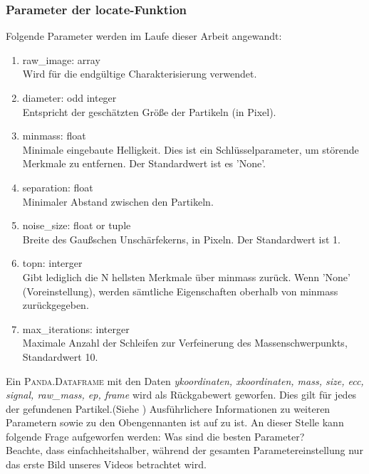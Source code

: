 	\subsubsection{Parameter der locate-Funktion}
		Folgende Parameter werden im Laufe dieser Arbeit angewandt:

		\begin{enumerate}
    			\item raw\_image: array \\
    			Wird für die endgültige Charakterisierung verwendet.
    			\item diameter: odd integer \\
    			Entspricht der geschätzten Größe der Partikeln (in Pixel).
    			\item minmass: float \\
    			Minimale eingebaute Helligkeit. Dies ist ein Schlüsselparameter, um störende 				Merkmale zu entfernen. Der Standardwert ist es 'None'.
    			\item separation: float\\
    			Minimaler Abstand zwischen den Partikeln.    			
    			\item noise\_size: float or tuple\\
    			Breite des Gaußschen Unschärfekerns, in Pixeln. Der Standardwert ist 1.
    			\item topn: interger\\
    			Gibt lediglich die N hellsten Merkmale über minmass zurück. Wenn 							'None' (Voreinstellung), werden sämtliche Eigenschaften oberhalb von minmass 				zurückgegeben.
    			\item max\_iterations: interger\\
    			Maximale Anzahl der Schleifen zur Verfeinerung des Massenschwerpunkts, 					Standardwert 10.
    			
		\end{enumerate}
		
Ein \textsc{Panda.Dataframe} mit den Daten \textit{y\-koordinaten, x\-koordinaten, mass, size, ecc, signal, raw\_mass, ep, frame} wird als Rückgabewert geworfen. Dies gilt für jedes der gefundenen Partikel.(Siehe )
Ausführlichere Informationen zu  weiteren Parametern sowie zu den Obengennanten ist auf zu ist.%
An dieser Stelle kann folgende Frage aufgeworfen werden: Was sind die besten Parameter? \\
Beachte, dass einfachheitshalber, während der gesamten Parametereinstellung nur das erste Bild unseres Videos betrachtet wird.

